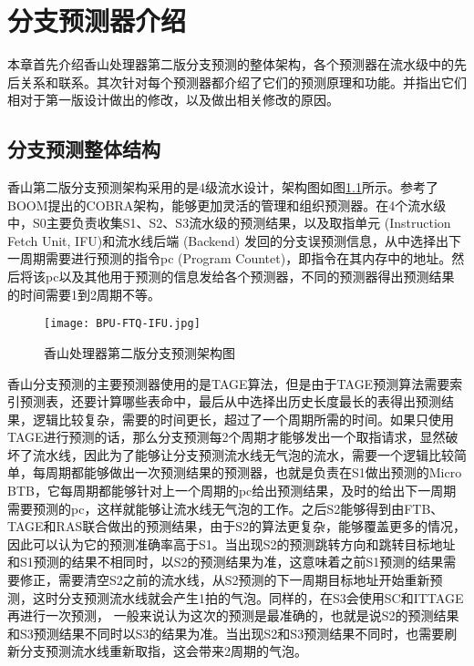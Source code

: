 \chapter{分支预测器介绍}


本章首先介绍香山处理器第二版分支预测的整体架构，各个预测器在流水级中的先后关系和联系。其次针对每个预测器都介绍了它们的预测原理和功能。并指出它们相对于第一版设计做出的修改，以及做出相关修改的原因。

\section{分支预测整体结构}

香山第二版分支预测架构采用的是4级流水设计，架构图如图\ref{fig:figure21}所示。参考了BOOM提出的COBRA架构\cite{cobra}，能够更加灵活的管理和组织预测器。在4个流水级中，S0主要负责收集S1、S2、S3流水级的预测结果，以及取指单元 (Instruction Fetch Unit, IFU)和流水线后端 (Backend) 发回的分支误预测信息，从中选择出下一周期需要进行预测的指令pc (Program Countet)，即指令在其内存中的地址。然后将该pc以及其他用于预测的信息发给各个预测器，不同的预测器得出预测结果的时间需要1到2周期不等。

\begin{figure}[htb]
	\centering
	\setlength\tabcolsep{3pt}  %
	\vspace{5pt} %
	\texttt{[image: BPU-FTQ-IFU.jpg]}
	\caption{香山处理器第二版分支预测架构图}
	\label{fig:figure21}
\end{figure}

香山分支预测的主要预测器使用的是TAGE算法\cite{tage, tage-sc-l, new-case-tage}，但是由于TAGE预测算法需要索引预测表，还要计算哪些表命中，最后从中选择出历史长度最长的表得出预测结果，逻辑比较复杂，需要的时间更长，超过了一个周期所需的时间。如果只使用TAGE进行预测的话，那么分支预测每2个周期才能够发出一个取指请求，显然破坏了流水线，因此为了能够让分支预测流水线无气泡的流水，需要一个逻辑比较简单，每周期都能够做出一次预测结果的预测器，也就是负责在S1做出预测的Micro BTB，它每周期都能够针对上一个周期的pc给出预测结果，及时的给出下一周期需要预测的pc，这样就能够让流水线无气泡的工作。之后S2能够得到由FTB、TAGE和RAS联合做出的预测结果，由于S2的算法更复杂，能够覆盖更多的情况，因此可以认为它的预测准确率高于S1。当出现S2的预测跳转方向和跳转目标地址和S1预测的结果不相同时，以S2的预测结果为准，这意味着之前S1预测的结果需要修正，需要清空S2之前的流水线，从S2预测的下一周期目标地址开始重新预测，这时分支预测流水线就会产生1拍的气泡。同样的，在S3会使用SC和ITTAGE再进行一次预测， 一般来说认为这次的预测是最准确的，也就是说S2的预测结果和S3预测结果不同时以S3的结果为准。当出现S2和S3预测结果不同时，也需要刷新分支预测流水线重新取指，这会带来2周期的气泡。

